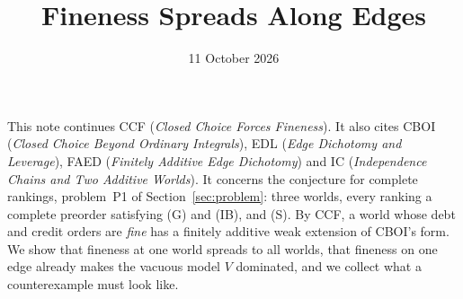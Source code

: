 \documentclass[11pt]{article}
\title{Fineness Spreads Along Edges}
\author{}\date{11 October 2026}
\theoremstyle{definition}\newtheorem{definition}[theorem]{Definition}
\theoremstyle{remark}\newtheorem{remark}[theorem]{Remark}
\begin{document}
\maketitle

\noindent
This note continues CCF (\emph{Closed Choice Forces Fineness}).
It also cites CBOI (\emph{Closed Choice Beyond Ordinary Integrals}), EDL
(\emph{Edge Dichotomy and Leverage}), FAED (\emph{Finitely Additive Edge
Dichotomy}) and IC (\emph{Independence Chains and Two Additive Worlds}). It
concerns
the conjecture for complete rankings, problem~P1 of
Section~\ref{sec:problem}: three worlds, every ranking a complete preorder
satisfying (G) and (IB), and (S). By CCF, a world whose debt and credit
orders are \emph{fine} has a finitely additive weak extension of CBOI's
form. We show that fineness at one world spreads to all worlds, that
fineness on one edge already makes the vacuous model $V$ dominated, and we
collect what a counterexample must look like.
\end{document}
